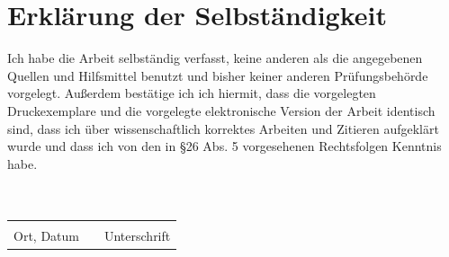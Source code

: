 \documentclass[abstracton]{scrreprt}
\begin{document}



\chapter*{Erkl\"arung der Selbst\"andigkeit}

    Ich habe die Arbeit selbst\"andig verfasst, keine anderen als die angegebenen Quellen und Hilfsmittel benutzt und bisher keiner anderen Prüfungsbeh\"orde vorgelegt. Außerdem best\"atige ich ich hiermit, dass die vorgelegten Druckexemplare und die vorgelegte elektronische Version der Arbeit identisch sind, dass ich über wissenschaftlich korrektes Arbeiten und Zitieren aufgekl\"art wurde und dass ich von den in \S 26 Abs. 5 vorgesehenen Rechtsfolgen Kenntnis habe.\\\\\\

    \begin{center}
        \begin{tabular}{lp{8em}l} 
            \hspace{5cm}   && \hspace{5cm} \\\cline{1-1}\cline{3-3} 
            Ort, Datum     && Unterschrift 
        \end{tabular}
    \end{center}
\end{document}
